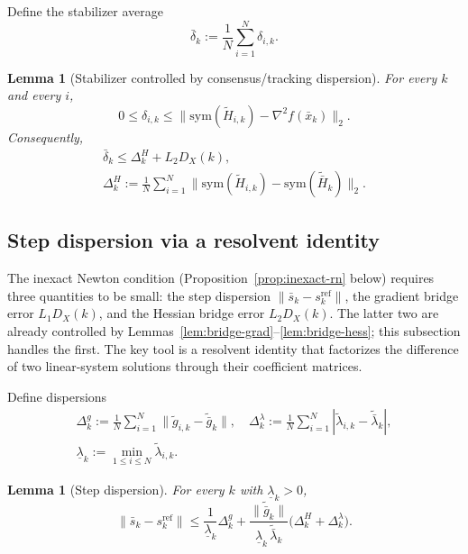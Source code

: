 \documentclass[10pt,twocolumn,letterpaper]{article}
\theoremstyle{compact}
\newtheorem{lemma}[theorem]{Lemma}
\theoremstyle{compactremark}
\begin{document}
Define the stabilizer average
\[
\bar\delta_k:=\frac1N\sum_{i=1}^N \delta_{i,k}.
\]

\begin{lemma}[Stabilizer controlled by consensus/tracking dispersion]\label{lem:delta_control}
For every $k$ and every $i$,
\[
0\le \delta_{i,k}\le \big\|\mathrm{sym}(\tilde H_{i,k})-\nabla^2 f(\bar x_k)\big\|_2.
\]
Consequently,
\begin{gather*}
\bar\delta_k\le \Delta_k^H + L_2D_X(k),\\
\Delta_k^H:=\tfrac1N\!\sum_{i=1}^N\big\|\mathrm{sym}(\tilde H_{i,k})-\mathrm{sym}(\tilde{\bar H}_k)\big\|_2 .
\end{gather*}
\end{lemma}

\subsection{Step dispersion via a resolvent identity}\label{ssec:stepdisp}
The inexact Newton condition (Proposition~\ref{prop:inexact-rn} below)
requires three quantities to be small: the step dispersion
$\|\bar s_k - s_k^{\mathrm{ref}}\|$, the gradient bridge error
$L_1 D_X(k)$, and the Hessian bridge error $L_2 D_X(k)$.
The latter two are already controlled by
Lemmas~\ref{lem:bridge-grad}--\ref{lem:bridge-hess};
this subsection handles the first.
The key tool is a resolvent identity that factorizes the
difference of two linear-system solutions through their
coefficient matrices.

Define dispersions
\begin{gather*}
\Delta_k^g:=\tfrac1N\textstyle\sum_{i=1}^N \|\tilde g_{i,k}-\tilde{\bar g}_k\|,\quad
\Delta_k^\lambda:=\tfrac1N\textstyle\sum_{i=1}^N |\tilde\lambda_{i,k}-\tilde{\bar\lambda}_k|,\\
\underline\lambda_k:=\min_{1\le i\le N}\tilde\lambda_{i,k}.
\end{gather*}

\begin{lemma}[Step dispersion]\label{lem:step-disp}
For every $k$ with $\underline\lambda_k>0$,
\[
\|\bar s_k-s_k^{\mathrm{ref}}\|
\le \frac{1}{\underline\lambda_k}\Delta_k^g
+\frac{\|\tilde{\bar g}_k\|}{\underline\lambda_k\,\tilde{\bar\lambda}_k}\big(\Delta_k^H+\Delta_k^\lambda\big).
\]
\end{lemma}
\end{document}
